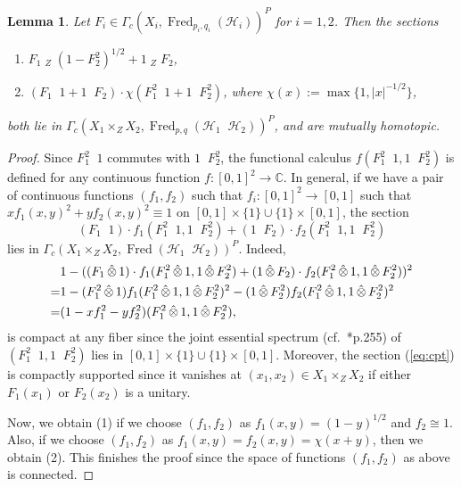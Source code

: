 \documentclass[11pt]{amsart}
\theoremstyle{definition}
\theoremstyle{plain}
\newtheorem{lem}[equation]{Lemma}
\theoremstyle{remark}
\newcommand{\bC}{\mathbb{C}}
\newcommand{\cH}{\mathcal{H}}
\DeclareMathOperator{\Fred}{Fred}
\DeclareMathOperator{\hotimes}{\hat{\otimes}}
\begin{document}
\begin{lem}\label{lem:prod}
Let $F_i \in \Gamma _c(X_i, \Fred_{p_i,q_i}(\cH_i))^P$ for $i=1,2$. Then the sections
\begin{enumerate}
    \item $F_1 \hotimes_Z (1-F_2^2)^{1/2} + 1 \hotimes_Z F_2$,
    \item $(F_1 \hotimes 1 + 1 \hotimes F_2)\cdot \chi(F_1^2 \hotimes 1 + 1 \hotimes F_2^2)$, where $\chi (x):=\max \{ 1 , |x|^{-1/2}\} $,
\end{enumerate}
both lie in $\Gamma_c(X_1 \times_Z X_2, \Fred_{p,q} (\cH_1 \hotimes \cH_2))^P$, and are mutually homotopic.
\end{lem}
\begin{proof}

Since $F_1^2 \hotimes 1$ commutes with $1 \hotimes F_2^2$, the functional calculus $f(F_1^2 \hotimes 1, 1 \hotimes F_2^2)$ is defined for any continuous function $f \colon [0,1]^2 \to \bC$.  
In general, if we have a pair of continuous functions $(f_1,f_2)$ such that $f_i \colon [0,1]^2 \to [0,1]$ such that $xf_1(x,y)^2 + yf_2(x,y)^2 \equiv 1$ on $[0,1] \times \{1\} \cup \{1 \} \times [0,1]$, the section
\[ (F_1 \hotimes 1) \cdot  f_1(F_1^2 \hotimes 1, 1 \hotimes F_2^2) + (1 \hotimes F_2) \cdot f_2(F_1^2 \hotimes 1, 1 \hotimes F_2^2) \]
lies in $\Gamma_c(X_1 \times_Z X_2, \Fred (\cH_1 \hotimes \cH_2))^P$.
Indeed,
\begin{align}
    &1-((F_1 \hotimes 1) \cdot  f_1(F_1^2 \hotimes 1, 1 \hotimes F_2^2) + (1 \hotimes F_2) \cdot f_2(F_1^2 \hotimes 1, 1 \hotimes F_2^2))^2 \notag \\
    =& 1- (F_1^2 \hotimes 1) f_1(F_1^2 \hotimes 1, 1 \hotimes F_2^2)^2 - (1 \hotimes F_2^2)f_2(F_1^2 \hotimes 1, 1 \hotimes F_2^2)^2 \notag \\
    =& (1-xf_1^2 -yf_2^2)(F_1^2 \hotimes 1, 1 \hotimes F_2^2), \label{eq:cpt}
    \end{align}
is compact at any fiber since the joint essential spectrum (cf.~\cite{davidsonAlgebrasExample1996}*{p.255}) of $(F_1^2 \hotimes 1, 1 \hotimes F_2^2)$ lies in $[0,1] \times \{1\} \cup \{1 \} \times [0,1]$. Moreover, the section (\ref{eq:cpt}) is compactly supported since it vanishes at $(x_1,x_2) \in X_1 \times _Z X_2$ if either $F_1(x_1)$ or $F_2(x_2)$ is a unitary. 


Now, we obtain (1) if we choose $(f_1,f_2)$ as $f_1(x,y)=(1-y)^{1/2}$ and $f_2 \cong 1$. Also, if we choose $(f_1,f_2) $ as $f_1(x,y) = f_2(x,y)=\chi(x+y)$, then we obtain (2). This finishes the proof since the space of functions $(f_1,f_2)$ as above is connected. 
\end{proof}
\end{document}
